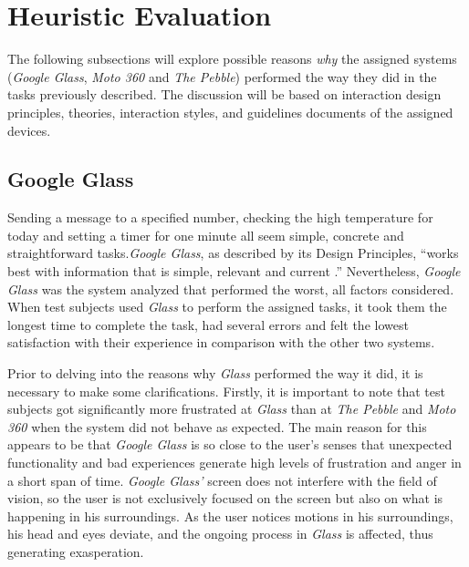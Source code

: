 \documentclass[11pt,a4paper]{scrartcl}
\begin{document}


\section{Heuristic Evaluation}
The following subsections will explore possible reasons \textit{why} the assigned systems (\textit{Google Glass}, \textit{Moto 360} and \textit{The Pebble}) performed the way they did in the tasks previously described. The discussion will be based on interaction design principles, theories, interaction styles, and guidelines documents of the assigned devices.

\subsection{Google Glass}
Sending a message to a specified number, checking the high temperature for today and setting a timer for one minute all seem simple, concrete and straightforward tasks.\textit{Google Glass}, as described by its Design Principles, ``works best with information that is simple, relevant and current \cite{google01}.''  Nevertheless, \textit{Google Glass} was the system analyzed that performed the worst, all factors considered. When test subjects used \textit{Glass} to perform the assigned tasks, it took them the longest time to complete the task, had several errors and felt the lowest satisfaction with their experience in comparison with the other two systems.

Prior to delving into the reasons why \textit{Glass} performed the way it did, it is necessary to make some clarifications. Firstly, it is important to note that test subjects got significantly more frustrated at \textit{Glass} than at \textit{The Pebble} and \textit{Moto 360} when the system did not behave as expected. The main reason for this appears to be that \textit{Google Glass} is so close to the user's senses that unexpected functionality and bad experiences generate high levels of frustration and anger in a short span of time. \textit{Google Glass'} screen does not interfere with the field of vision, so the user is not exclusively focused on the screen but also on what is happening in his surroundings. As the user notices motions in his surroundings, his head and eyes deviate, and the ongoing process in \textit{Glass} is affected, thus generating exasperation.
\end{document}
